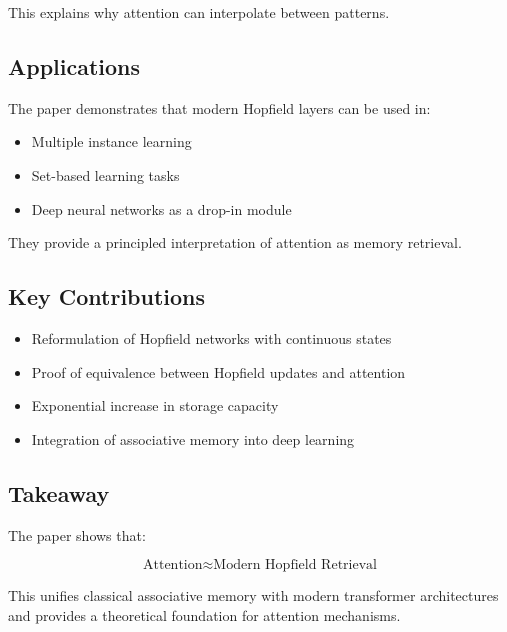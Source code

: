 \documentclass[12pt]{article}
\begin{document}
This explains why attention can interpolate between patterns.

\subsection{Applications}

The paper demonstrates that modern Hopfield layers can be used in:

\begin{itemize}
		\item Multiple instance learning
		\item Set-based learning tasks
		\item Deep neural networks as a drop-in module
\end{itemize}

They provide a principled interpretation of attention as memory retrieval.

\subsection{Key Contributions}

\begin{itemize}
		\item Reformulation of Hopfield networks with continuous states
		\item Proof of equivalence between Hopfield updates and attention
		\item Exponential increase in storage capacity
		\item Integration of associative memory into deep learning
\end{itemize}

\subsection{Takeaway}

The paper shows that:

\[
		\text{Attention} \approx \text{Modern Hopfield Retrieval}
\]

This unifies classical associative memory with modern transformer architectures and provides a theoretical
foundation for attention mechanisms.
\end{document}
